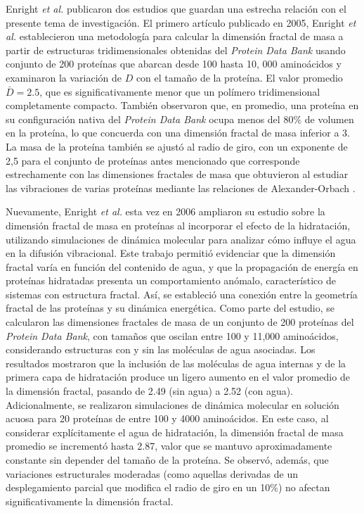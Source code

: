 Enright \textit{et al.} publicaron dos estudios que guardan una estrecha relación con el presente tema de investigación. El primero artículo publicado en 2005, Enright \textit{et al.}
\cite{Enright2005} establecieron una metodología  para calcular la dimensión fractal de masa a partir de estructuras tridimensionales obtenidas del \textit{Protein Data Bank} usando conjunto de 200 proteínas que abarcan desde 100 hasta 10, 000 aminoácidos y examinaron la variación de $D$ con el tamaño de la proteína. El valor promedio $\bar{D} = 2.5$, que es significativamente menor que un polímero tridimensional completamente compacto. También observaron que, en promedio, una proteína en su configuración nativa del \textit{Protein Data Bank} ocupa menos del $80\%$ de volumen en la proteína, lo que concuerda con una dimensión fractal de masa inferior a 3. La masa de la proteína también se ajustó al radio de giro, con un exponente de 2,5 para el conjunto de proteínas antes mencionado que corresponde estrechamente con las dimensiones fractales de masa que obtuvieron al estudiar las vibraciones de varias proteínas mediante las relaciones de Alexander-Orbach \cite{Alexander1982}.
 
 Nuevamente, Enright \textit{et al.}\cite{Enright2006} esta vez en 2006 ampliaron su estudio sobre la dimensión fractal de masa en proteínas al incorporar el efecto de la hidratación, utilizando simulaciones de dinámica molecular para analizar cómo influye el agua en la difusión vibracional. Este trabajo permitió evidenciar que la dimensión fractal varía en función del contenido de agua, y que la propagación de energía en proteínas hidratadas presenta un comportamiento anómalo, característico de sistemas con estructura fractal. Así, se estableció una conexión entre la geometría fractal de las proteínas y su dinámica energética. Como parte del estudio, se calcularon las dimensiones fractales de masa de un conjunto de 200 proteínas del \textit{Protein Data Bank}, con tamaños que oscilan entre 100 y 11,000 aminoácidos, considerando estructuras con y sin las moléculas de agua asociadas. Los resultados mostraron que la inclusión de las moléculas de agua internas y de la primera capa de hidratación produce un ligero aumento en el valor promedio de la dimensión fractal, pasando de 2.49 (sin agua) a 2.52 (con agua). Adicionalmente, se realizaron simulaciones de dinámica molecular en solución acuosa para 20 proteínas de entre 100 y 4000 aminoácidos. En este caso, al considerar explícitamente el agua de hidratación, la dimensión fractal de masa promedio se incrementó hasta 2.87, valor que se mantuvo aproximadamente constante sin depender del tamaño de la proteína. Se observó, además, que variaciones estructurales moderadas (como aquellas derivadas de un desplegamiento parcial que modifica el radio de giro en un 10\%) no afectan significativamente la dimensión fractal.


